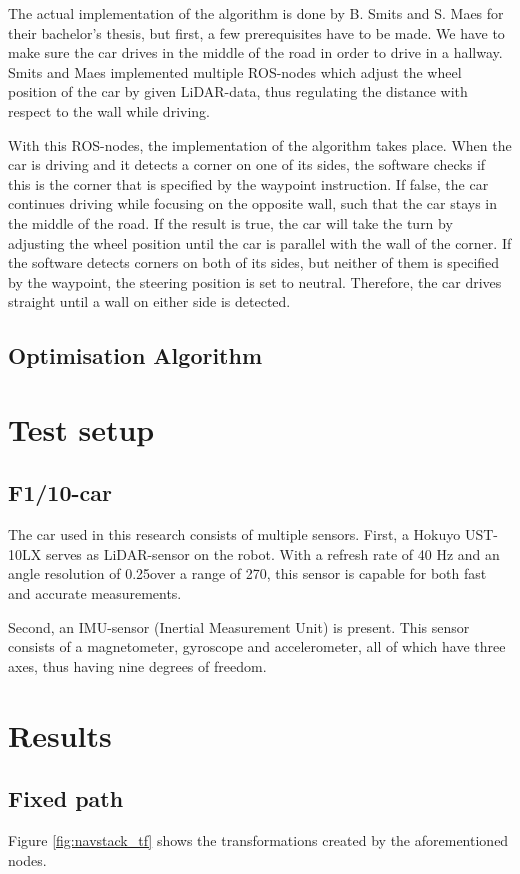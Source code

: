 \documentclass[conference,a4paper]{IEEEtran}
\begin{document}
The actual implementation of the algorithm is done by B. Smits and S. Maes for their bachelor's thesis, but first, a few prerequisites have to be made. We have to make sure the car drives in the middle of the road in order to drive in a hallway. Smits and Maes implemented multiple ROS-nodes which adjust the wheel position of the car by given LiDAR-data, thus regulating the distance with respect to the wall while driving. 

With this ROS-nodes, the implementation of the algorithm takes place. When the car is driving and it detects a corner on one of its sides, the software checks if this is the corner that is specified by the waypoint instruction. If false, the car continues driving while focusing on the opposite wall, such that the car stays in the middle of the road. If the result is true, the car will take the turn by adjusting the wheel position until the car is parallel with the wall of the corner. If the software detects corners on both of its sides, but neither of them is specified by the waypoint, the steering position is set to neutral. Therefore, the car drives straight until a wall on either side is detected.
\subsection{Optimisation Algorithm}

\section{Test setup}
\subsection{F1/10-car}
The car used in this research consists of multiple sensors. First, a Hokuyo UST-10LX serves as LiDAR-sensor on the robot. With a refresh rate of 40 Hz and an angle resolution of 0.25\degree over a range of 270\degree, this sensor is capable for both fast and accurate measurements. 

Second, an IMU-sensor (Inertial Measurement Unit) is present. This sensor consists of a magnetometer, gyroscope and accelerometer, all of which have three axes, thus having nine degrees of freedom.

\section{Results}
\subsection{Fixed path}
Figure \ref{fig:navstack_tf} shows the transformations created by the aforementioned nodes. 
\end{document}

